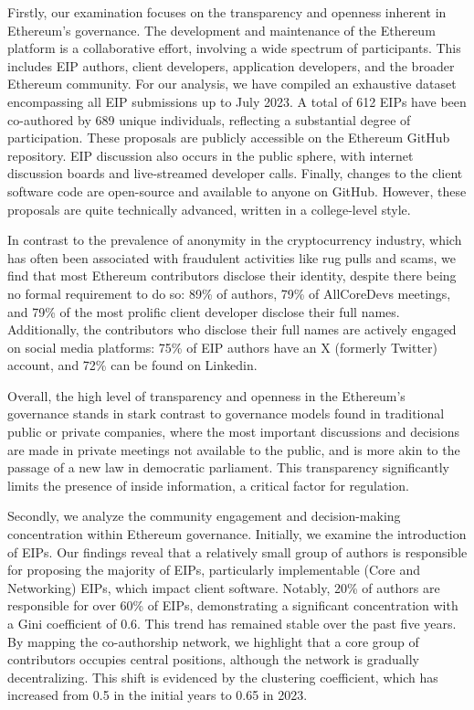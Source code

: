 \documentclass[No]{AEA}
\begin{document}
Firstly, our examination focuses on the transparency and openness inherent in Ethereum's governance. The development and maintenance of the Ethereum platform is a collaborative effort, involving a wide spectrum of participants. This includes EIP authors, client developers, application developers, and the broader Ethereum community. For our analysis, we have compiled an exhaustive dataset encompassing all EIP submissions up to July 2023. A total of 612 EIPs have been co-authored by 689  unique individuals, reflecting a substantial degree of participation. These proposals are publicly accessible on the Ethereum GitHub repository. EIP discussion also occurs in the public sphere, with internet discussion boards and live-streamed developer calls. Finally, changes to the client software code are open-source and available to anyone on GitHub. However, these proposals are quite technically advanced, written in a college-level style. 

In contrast to the prevalence of anonymity in the cryptocurrency industry, which has often been associated with fraudulent activities like rug pulls and scams, we find that most Ethereum contributors disclose their identity, despite there being no formal requirement to do so: 89\% of authors, 79\% of AllCoreDevs meetings, and 79\% of the most prolific client developer disclose their full names. Additionally, the contributors who disclose their full names are actively engaged on social media platforms: 75\% of EIP authors have an X (formerly Twitter) account, and 72\% can be found on Linkedin. 

Overall, the high level of transparency and openness in the Ethereum's governance stands in stark contrast to governance models found in traditional public or private companies, where the most important discussions and decisions are made in private meetings not available to the public, and is more akin to the passage of a new law in democratic parliament. This transparency significantly limits the presence of inside information, a critical factor for regulation.  

Secondly, we analyze the community engagement and decision-making concentration within Ethereum governance. Initially, we examine the introduction of EIPs. Our findings reveal that a relatively small group of authors is responsible for proposing the majority of EIPs, particularly implementable (Core and Networking) EIPs, which impact client software. Notably, 20\% of authors are responsible for over 60\% of EIPs, demonstrating a significant concentration with a Gini coefficient of 0.6. This trend has remained stable over the past five years. By mapping the co-authorship network, we highlight that a core group of contributors occupies central positions, although the network is gradually decentralizing. This shift is evidenced by the clustering coefficient, which has increased from 0.5 in the initial years to 0.65 in 2023.
\end{document}
